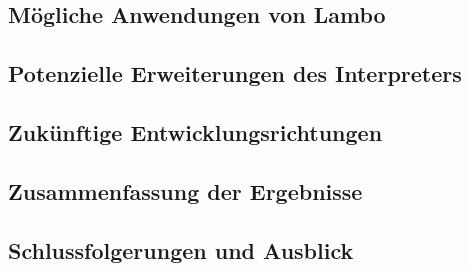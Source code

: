 \documentclass{article}
\begin{document}
\subsection{Mögliche Anwendungen von Lambo}

\subsection{Potenzielle Erweiterungen des Interpreters}

\subsection{Zukünftige Entwicklungsrichtungen}

\subsection{Zusammenfassung der Ergebnisse}

\subsection{Schlussfolgerungen und Ausblick}

\end{document}
